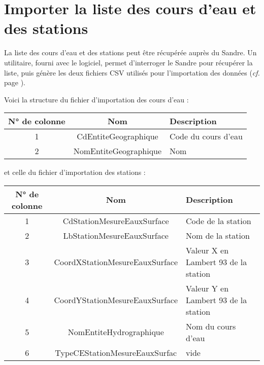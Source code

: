 \section{Importer la liste des cours d'eau et des stations}

La liste des cours d'eau et des stations peut être récupérée auprès du Sandre. Un utilitaire, fourni avec le logiciel, permet d'interroger le Sandre pour récupérer la liste, puis génère les deux fichiers CSV utilisés pour l'importation des données (\textit{cf.} page \pageref{sandre}).

Voici la structure du fichier d'importation des cours d'eau :

\begin{tabular}{|c|c|l|}
\hline 
N° de colonne & Nom & Description \\ 
\hline 
1 & CdEntiteGeographique & Code du cours d'eau\\ 
\hline 
2 & NomEntiteGeographique & Nom \\ 
\hline 

\end{tabular}

et celle du fichier d'importation des stations :

\begin{tabular}{|c|c|l|}
\hline 
N° de colonne & Nom & Description \\ 
\hline 
1 & CdStationMesureEauxSurface & Code de la station\\ 
\hline 
2 & LbStationMesureEauxSurface & Nom de la station \\ 
\hline 
3 & CoordXStationMesureEauxSurface & Valeur X en Lambert 93 de la station \\ 
\hline 
4 & CoordYStationMesureEauxSurface & Valeur Y en Lambert 93 de la station \\ 
\hline 
5 & NomEntiteHydrographique & Nom du cours d'eau \\ 
\hline 
6 & TypeCEStationMesureEauxSurfac & vide \\ 
\hline 
\end{tabular}

